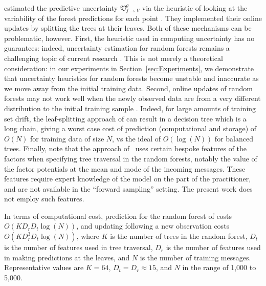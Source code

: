 \documentclass[english]{article}
\theoremstyle{plain}
\theoremstyle{plain}
\newcommand{\factor}{f}				%
\newcommand{\outV}{V}                         %
\newcommand{\uncertaintyMsg}[3]{{\mathfrak V}_{#1 \rightarrow #2}^{#3}}			%
\newcommand{\wjnote}[1]{ }
\newcommand{\secref}[1]{Section~\ref{#1}}
\begin{document}
\cite{Eslami2014} estimated the predictive uncertainty  $\uncertaintyMsg{\factor}{\outV}{\theta}$  via
the heuristic of looking at the variability of the forest predictions for each point \citep{CriSho13}.
They implemented their online updates by splitting the trees at their
leaves.
Both of these mechanisms can be problematic, however. First, the heuristic
used in computing uncertainty has no guarantees: indeed, uncertainty estimation for
random forests remains a challenging topic of current research \citep{Hutter2009}. This is not merely a theoretical
consideration: in our experiments in \secref{sec:Experiments}, we demonstrate that 
uncertainty heuristics for random forests become unstable and inaccurate as we move away from the initial
training data. Second, online updates of random forests may not work well
when the newly observed data are from a very different distribution to the
initial training sample \citep[e.g.][Fig. 3]{LakRoyTeh14}. 
Indeed, for large amounts of training set drift, the
leaf-splitting approach of \citeauthor{Eslami2014} can result in a decision tree which is a long chain, giving a worst case
cost of prediction (computational and storage) of $O(N)$ for training data of size $N$, vs the ideal of $O(\log(N))$
for balanced trees.
Finally, note that the approach of \citeauthor{Eslami2014}\ uses certain bespoke features of the factors when
specifying tree traversal in the random forests,
notably the value of the factor potentials at the mean and mode of the incoming messages.
These features 
require expert knowledge of the model on the part
of the practitioner, and are not available in the ``forward sampling'' setting. The present
work does not employ such features.


In terms of computational cost, prediction for the random forest of \citeauthor{Eslami2014} costs $O(K D_r D_t \log(N))$,
and updating following a new observation costs  $O(K D_r^3 D_t \log(N))$,
where $K$ is the number of trees in the random forest, $D_t$
is the number of features used in tree traversal, $D_r$ is the number of features used in making predictions
at the leaves, and $N$ is the number of training messages.
Representative values are $K=64$, $D_t=D_r\approx 15$, and $N$ in the range of  1,000 to 5,000.
\end{document}
